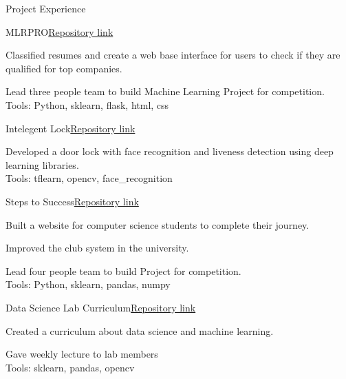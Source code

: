 \documentclass[10pt]{resume} %
\begin{document}
\begin{rSection}{Project Experience}


\begin{rSubsection}{MLRPRO}{\href{https://github.com/AhmetHamzaEmra/MLRPRO}{Repository link}}{}{}
\item Classified resumes and create a web base interface for users to check if they are qualified for top companies.
\item Lead three people team to build Machine Learning Project for competition.
\\ Tools: Python, sklearn, flask, html, css

\end{rSubsection}



\begin{rSubsection}{Intelegent Lock}{\href{https://github.com/AhmetHamzaEmra/Intelegent_Lock}{Repository link}}{}{}
\item Developed a door lock with face recognition and liveness detection using deep learning libraries.
\\ Tools: tflearn, opencv, face\_recognition
\end{rSubsection}



\begin{rSubsection}{Steps to Success}{\href{https://github.com/AhmetHamzaEmra/StepsToSuccess}{Repository link}}{}{}
\item Built a website for computer science students to complete their journey.
\item Improved the club system in the university. 
\item Lead four people team to build Project for competition.
\\ Tools: Python, sklearn, pandas, numpy
\end{rSubsection}



\begin{rSubsection}{Data Science Lab Curriculum}{\href{https://github.com/AhmetHamzaEmra/DataScienceLab}{Repository link}}{}{}
\item Created a curriculum about data science and machine learning.
\item Gave weekly lecture to lab members
\\ Tools: sklearn, pandas, opencv
\end{rSubsection}



\end{rSection}
\end{document}

